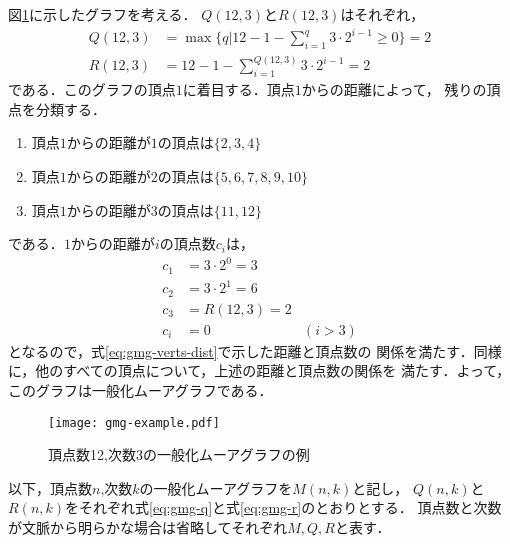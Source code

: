 \begin{example}
  図\ref{fig:gmg-example}に示したグラフを考える．
  $Q(12,3)$と$R(12,3)$はそれぞれ，
  \begin{align*}
    Q(12,3) &= \max\{q | 12-1-\sum_{i=1}^{q}3\cdot2^{i-1} \geq 0\} = 2 \\
    R(12,3) &= 12 - 1 - \sum_{i=1}^{Q(12,3)}3\cdot2^{i-1} = 2
  \end{align*}
  である．このグラフの頂点$1$に着目する．頂点$1$からの距離によって，
  残りの頂点を分類する．
  \begin{enumerate}
  \item 頂点$1$からの距離が$1$の頂点は$\{2,3,4\}$
  \item 頂点$1$からの距離が$2$の頂点は$\{5,6,7,8,9,10\}$
  \item 頂点$1$からの距離が$3$の頂点は$\{11,12\}$
  \end{enumerate}
  である．$1$からの距離が$i$の頂点数$c_i$は，
  \begin{align*}
  c_1 &= 3\cdot2^0 = 3 & \\
  c_2 &= 3\cdot2^1 = 6 & \\
  c_3 &= R(12,3) = 2 & \\
  c_i &= 0 & (i>3)
  \end{align*}
  となるので，式\ref{eq:gmg-verts-dist}で示した距離と頂点数の
  関係を満たす．同様に，他のすべての頂点について，上述の距離と頂点数の関係を
  満たす．よって，このグラフは一般化ムーアグラフである．
  \begin{figure}
    \centering
    \texttt{[image: gmg-example.pdf]}
    \caption{頂点数12,次数3の一般化ムーアグラフの例}
    \label{fig:gmg-example}
  \end{figure}
\end{example}
以下，頂点数$n$,次数$k$の一般化ムーアグラフを$M(n,k)$と記し，
$Q(n,k)$と$R(n,k)$をそれぞれ式\ref{eq:gmg-q}と式\ref{eq:gmg-r}のとおりとする．
頂点数と次数が文脈から明らかな場合は省略してそれぞれ$M,Q,R$と表す．

